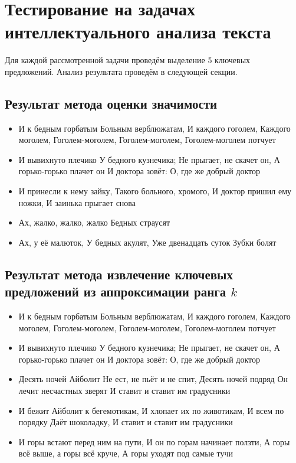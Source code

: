 \newpage





\section{Тестирование на задачах интеллектуального анализа текста}

Для каждой рассмотренной задачи проведём выделение 5 ключевых предложений.
Анализ результата проведём в следующей секции.


\subsection{Результат метода оценки значимости}

\begin{itemize}
  \item И к бедным горбатым Больным верблюжатам, И каждого гоголем, Каждого моголем, Гоголем-моголем, Гоголем-моголем, Гоголем-моголем потчует
  \item И вывихнуто плечико У бедного кузнечика; Не прыгает, не скачет он, А горько-горько плачет он И доктора зовёт: О, где же добрый доктор
  \item И принесли к нему зайку, Такого больного, хромого, И доктор пришил ему ножки, И заинька прыгает снова
  \item Ах, жалко, жалко, жалко Бедных страусят
  \item Ах, у её малюток, У бедных акулят, Уже двенадцать суток Зубки болят
\end{itemize}



\subsection{Результат метода извлечение ключевых предложений из аппроксимации ранга $k$}

\begin{itemize}
  \item И к бедным горбатым Больным верблюжатам, И каждого гоголем, Каждого моголем, Гоголем-моголем, Гоголем-моголем, Гоголем-моголем потчует
  \item И вывихнуто плечико У бедного кузнечика; Не прыгает, не скачет он, А горько-горько плачет он И доктора зовёт: О, где же добрый доктор
  \item Десять ночей Айболит Не ест, не пьёт и не спит, Десять ночей подряд Он лечит несчастных зверят И ставит и ставит им градусники
  \item И бежит Айболит к бегемотикам, И хлопает их по животикам, И всем по порядку Даёт шоколадку, И ставит и ставит им градусники
  \item И горы встают перед ним на пути, И он по горам начинает ползти, А горы всё выше, а горы всё круче, А горы уходят под самые тучи
\end{itemize}




